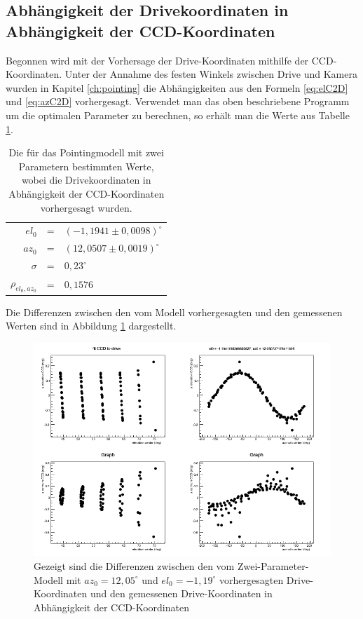 \subsection{Abhängigkeit der Drivekoordinaten in Abhängigkeit der CCD-Koordinaten}
Begonnen wird mit der Vorhersage der Drive-Koordinaten mithilfe der CCD-Koordinaten. Unter der Annahme des festen Winkels zwischen Drive und Kamera wurden in Kapitel \ref{ch:pointing} die Abhängigkeiten aus den Formeln \ref{eq:elC2D} und \ref{eq:azC2D} vorhergesagt. Verwendet man das oben beschriebene Programm um die optimalen Parameter zu berechnen, so erhält man die Werte aus Tabelle \ref{tab:C2D}.
\begin{table}[htbp]
\centering
\begin{tabular}{rcl}
\toprule
$el_0$ &=& $(-1,1941\pm0,0098)^{\circ}$\\
$az_0$ &=& $(12,0507\pm0,0019)^{\circ}$\\
$\sigma$ &=& $0,23^{\circ}$\\
$\rho_{el_0,az_0}$ &=& $0,1576$\\
\bottomrule
\end{tabular}
\label{tab:C2D}
\caption{Die für das Pointingmodell mit zwei Parametern bestimmten Werte, wobei die Drivekoordinaten in Abhängigkeit der CCD-Koordinaten vorhergesagt wurden.}
\end{table}
Die Differenzen zwischen den vom Modell vorhergesagten und den gemessenen Werten sind in Abbildung \ref{img:C2D} dargestellt.
\begin{figure}[htbp]
\centering
\includegraphics[width=\textwidth]{../341/run341C2D.png}
\caption{Gezeigt sind die Differenzen zwischen den vom Zwei-Parameter-Modell mit $az_0=12,05^{\circ}$ und $el_0=-1,19^{\circ}$ vorhergesagten Drive-Koordinaten und den gemessenen Drive-Koordinaten in Abhängigkeit der CCD-Koordinaten}
\label{img:C2D}
\end{figure}

